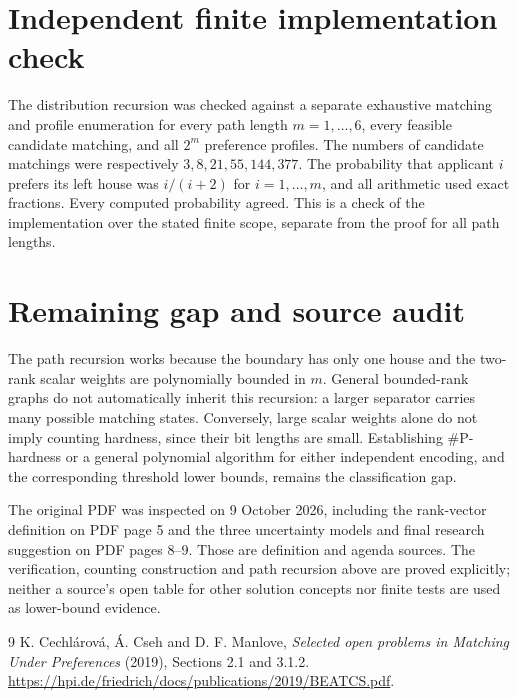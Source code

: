 \documentclass[11pt]{article}
\theoremstyle{remark}
\begin{document}
\section{Independent finite implementation check}
The distribution recursion was checked against a separate exhaustive matching and profile enumeration for every path length $m=1,\ldots,6$, every feasible candidate matching, and all $2^m$ preference profiles. The numbers of candidate matchings were respectively $3,8,21,55,144,377$. The probability that applicant $i$ prefers its left house was $i/(i+2)$ for $i=1,\ldots,m$, and all arithmetic used exact fractions. Every computed probability agreed. This is a check of the implementation over the stated finite scope, separate from the proof for all path lengths.

\section{Remaining gap and source audit}
The path recursion works because the boundary has only one house and the two-rank scalar weights are polynomially bounded in $m$. General bounded-rank graphs do not automatically inherit this recursion: a larger separator carries many possible matching states. Conversely, large scalar weights alone do not imply counting hardness, since their bit lengths are small. Establishing \#P-hardness or a general polynomial algorithm for either independent encoding, and the corresponding threshold lower bounds, remains the classification gap.

The original PDF \cite{ccm} was inspected on 9 October 2026, including the rank-vector definition on PDF page 5 and the three uncertainty models and final research suggestion on PDF pages 8--9. Those are definition and agenda sources. The verification, counting construction and path recursion above are proved explicitly; neither a source's open table for other solution concepts nor finite tests are used as lower-bound evidence.

\begin{thebibliography}{9}
 K. Cechl\'arov\'a, \'A. Cseh and D. F. Manlove, \emph{Selected open problems in Matching Under Preferences} (2019), Sections 2.1 and 3.1.2. \url{https://hpi.de/friedrich/docs/publications/2019/BEATCS.pdf}.
\end{thebibliography}
\end{document}
